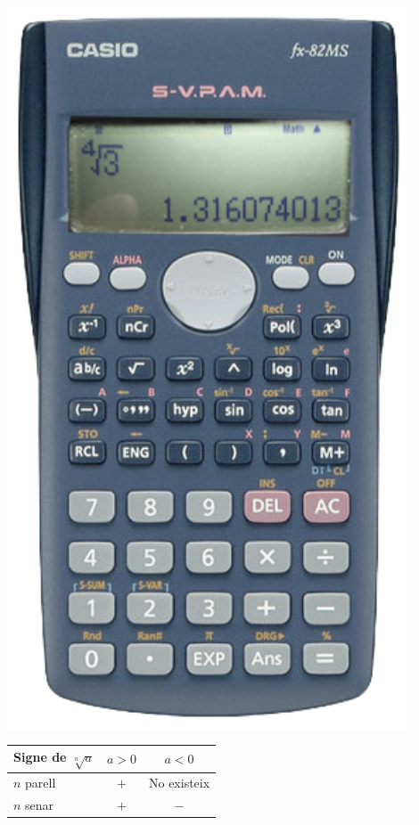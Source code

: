 \begin{blueshaded}
\begin{minipage}{0.7\textwidth}
		
	\end{minipage}
	\begin{minipage}{0.3\textwidth}
		\centering
		\includegraphics[width=0.9\textwidth]{img-02/fx82ms-b}
	\end{minipage}
	
	
	
\end{blueshaded}


\begin{theorybox}

\begin{center}
	\begin{tabular}{l|c|c}
		 Signe de $\sqrt[n]{a}$ & $a>0$ & $a<0$ \\ \hline
		 $n$ parell & $+$ & No existeix \\ \hline
		 $n$ senar & $+$ & $-$
	\end{tabular}
\end{center}
\end{theorybox}


